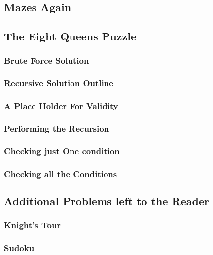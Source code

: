 \documentclass[10pt,a4paper]{book}
\begin{document}
\subsection{Mazes Again}



\subsection{The Eight Queens Puzzle}

\subsubsection{Brute Force Solution}

\subsubsection{Recursive Solution Outline}

\subsubsection{A Place Holder For Validity}

\subsubsection{Performing the Recursion}

\subsubsection{Checking just One condition}


\subsubsection{Checking all the Conditions}




\subsection{Additional Problems left to the Reader}

\subsubsection{Knight's Tour}

\subsubsection{Sudoku}
\end{document}
